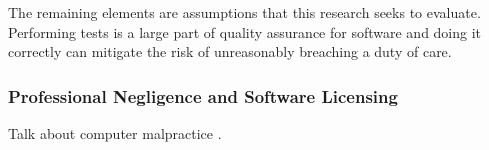 The remaining elements are assumptions that this research seeks to evaluate.
Performing tests is a large part of quality assurance for software and doing it
correctly can mitigate the risk of unreasonably breaching a duty of care.

\subsubsection{Professional Negligence and Software Licensing}
Talk about computer malpractice \cite{Kaner96}.
